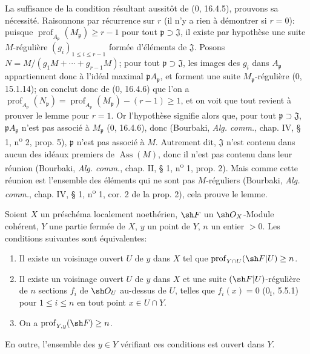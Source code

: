 La suffisance de la condition résultant aussitôt de ($0$, 16.4.5), prouvons sa nécessité. Raisonnons par récurrence sur $r$ (il n'y a rien à démontrer si $r=0$): puisque $\operatorname{prof}_{A_{\mathfrak p}}(M_{\mathfrak p})\geq r-1$ pour tout $\mathfrak p\supset\mathfrak J$, il existe par hypothèse une suite $M$-régulière $(g_i)_{1\leq i\leq r-1}$ formée d'éléments de $\mathfrak J$. Posons $N=M/(g_1M+\cdots+g_{r-1}M)$; pour tout $\mathfrak p\supset\mathfrak J$, les images des $g_i$ dans $A_{\mathfrak p}$ appartiennent donc à l'idéal maximal $\mathfrak pA_{\mathfrak p}$, et forment une suite $M_{\mathfrak p}$-régulière ($0$, 15.1.14); on conclut donc de ($0$, 16.4.6) que l'on a $\operatorname{prof}_{A_{\mathfrak p}}(N_{\mathfrak p})=\operatorname{prof}_{A_{\mathfrak p}}(M_{\mathfrak p})-(r-1)\geq1$, et on voit que tout revient à prouver le lemme pour $r=1$. Or l'hypothèse signifie alors que, pour tout $\mathfrak p\supset\mathfrak J$, $\mathfrak pA_{\mathfrak p}$ n'est pas associé à $M_{\mathfrak p}$ ($0$, 16.4.6), donc (Bourbaki, \emph{Alg. comm.}, chap. IV, § 1, n\textsuperscript{o} 2, prop. 5), $\mathfrak p$ n'est pas associé à $M$. Autrement dit, $\mathfrak J$ n'est contenu dans aucun des idéaux premiers de $\operatorname{Ass}(M)$, donc il n'est pas contenu dans leur réunion (Bourbaki, \emph{Alg. comm.}, chap. II, § 1, n\textsuperscript{o} 1, prop. 2). Mais comme cette réunion est l'ensemble des éléments qui ne sont pas $M$-réguliers (Bourbaki, \emph{Alg. comm.}, chap. IV, § 1, n\textsuperscript{o} 1, cor. 2 de la prop. 2), cela prouve le lemme.

\begin{proposition}[19.9.3]
\label{IV.19.9.3}
Soient $X$ un préschéma localement noethérien, $\sh F$ un $\sh O_X$-Module cohérent, $Y$ une partie fermée de $X$, $y$ un point de $Y$, $n$ un entier $>0$. Les conditions suivantes sont équivalentes:
\begin{enumerate}
  \item[a)] Il existe un voisinage ouvert $U$ de $y$ dans $X$ tel que $\operatorname{prof}_{Y\cap U}(\sh F|U)\geq n$.
  \item[b)] Il existe un voisinage ouvert $U$ de $y$ dans $X$ et une suite $(\sh F|U)$-régulière de $n$ sections $f_i$ de $\sh O_U$ au-dessus de $U$, telles que $f_i(x)=0$ ($0_{\mathrm I}$, 5.5.1) pour $1\leq i\leq n$ en tout point $x\in U\cap Y$.
  \item[c)] On a $\operatorname{prof}_{Y,y}(\sh F)\geq n$.
\end{enumerate}
En outre, l'ensemble des $y\in Y$ vérifiant ces conditions est ouvert dans $Y$.
\end{proposition}

